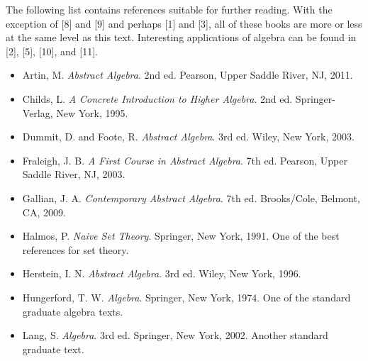  
{\small
The following list contains references suitable for further reading.  With the exception of [8] and [9] and perhaps [1] and [3], all of these books are more or less  at the same level as this text.  Interesting applications of algebra  can be found in [2], [5], [10], and [11].
\begin{itemize}

\item[{ \bf [1]}] %
Artin, M. 
{\it Abstract Algebra}. 2nd ed.
Pearson, Upper Saddle River, NJ, 2011. 
 
\item[{ \bf [2]}] %
Childs, L. 
{\it A Concrete Introduction to Higher Algebra}. 2nd ed.
Springer-Verlag, New York, 1995. 

\item[{ \bf [3]}]
Dummit, D. and Foote, R. %
{\it Abstract Algebra}. 3rd ed. Wiley, New York,
2003. 
 
 
\item[{ \bf [4]}] %
Fraleigh, J. B. 
{\it A First Course in Abstract Algebra}. 7th ed.
Pearson, Upper Saddle River, NJ, 2003. 
 
\item[{ \bf [5]}] %
Gallian, J. A. 
{\it Contemporary Abstract Algebra}. 7th ed. Brooks/Cole, Belmont, CA, 2009.  
 
\item[{ \bf [6]}] %
Halmos, P. 
{\it Naive Set Theory}.  Springer, New York, 1991.
One of the best references for set theory. 
 
\item[{ \bf [7]}]  %
Herstein, I. N. 
{\it Abstract Algebra}. 3rd ed. Wiley, New York, 1996. 
 
\item[{ \bf [8]}] %
Hungerford, T. W. 
{\it Algebra}. Springer, New York, 1974. One
of the standard graduate algebra texts.
 
 \item[{ \bf [9]}] %
Lang, S. 
{\it Algebra}. 3rd ed. Springer, New York, 2002.
Another standard graduate text.
 

\end{itemize}}
